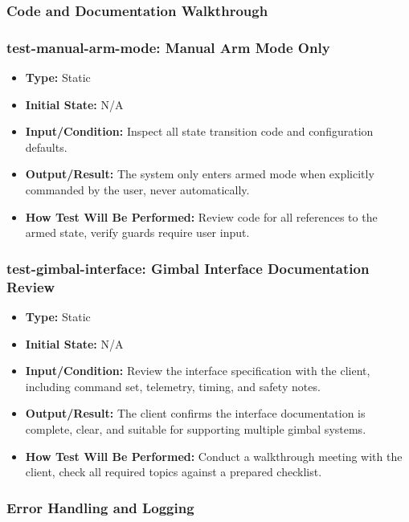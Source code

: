 \documentclass[12pt, titlepage]{article}
\begin{document}
\subsubsection{Code and Documentation Walkthrough}

\subsubsection*{test-manual-arm-mode: Manual Arm Mode Only}
\begin{itemize}
  \item \textbf{Type:} Static
  \item \textbf{Initial State:} N/A
  \item \textbf{Input/Condition:} Inspect all state transition code and configuration defaults.
  \item \textbf{Output/Result:} The system only enters armed mode when explicitly commanded by the user, never automatically.
  \item \textbf{How Test Will Be Performed:} Review code for all references to the armed state, verify guards require user input.
\end{itemize}

\subsubsection*{test-gimbal-interface: Gimbal Interface Documentation Review}
\begin{itemize}
  \item \textbf{Type:} Static
  \item \textbf{Initial State:} N/A
  \item \textbf{Input/Condition:} Review the interface specification with the client, including command set, telemetry, timing, and safety notes.
  \item \textbf{Output/Result:} The client confirms the interface documentation is complete, clear, and suitable for supporting multiple gimbal systems.
  \item \textbf{How Test Will Be Performed:} Conduct a walkthrough meeting with the client, check all required topics against a prepared checklist.
\end{itemize}

\subsubsection{Error Handling and Logging}
\end{document}
